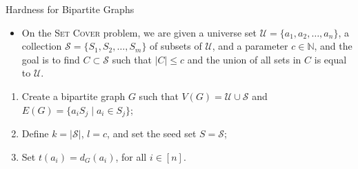 \documentclass[10pt,aspectratio=169,english]{beamer}
\begin{document}
\begin{frame}{Hardness for Bipartite Graphs}
	\begin{itemize}
		\item On the \textsc{Set Cover} problem, we are given a universe set $\mathcal{U} = \{a_1, a_2, \dots, a_n\}$, a collection $\mathcal{S} = \{S_1, S_2, \dots, S_m\}$ of subsets of $\mathcal{U}$, and a parameter $c \in \mathbb{N}$, and the goal is to find $C \subset \mathcal{S}$ such that $|C| \leq c$ and the union of all sets in $C$ is equal to $\mathcal{U}$.
	\end{itemize}
	\begin{enumerate}
		\item Create a bipartite graph $G$ such that $V(G) = \mathcal{U} \cup \mathcal{S}$ and $E(G) = \{a_iS_j \mid a_i \in S_j\}$;
		\item Define $k = |\mathcal{S}|$, $l = c$, and set the seed set $S = \mathcal{S}$;
		\item Set $t(a_i) = d_G(a_i)$, for all $i \in [n]$.
	\end{enumerate}
\end{frame}
\end{document}
